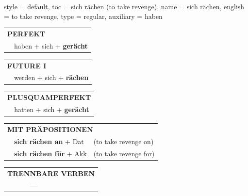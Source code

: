 \begin{verbentry}{
  style = {default},
  toc = {sich rächen (to take revenge)},
  name = {sich rächen},
  english = {to take revenge},
  type = {regular},
  auxiliary = {haben}
}
 \begin{tabular}{rl}
     \multicolumn{2}{l}{\textbf{PERFEKT}}\\
   & haben + sich + \textbf{gerächt}\\
  \end{tabular}
\hfill
   \begin{tabular}{rl}
    \multicolumn{2}{l}{\textbf{FUTURE I} }\\
   & werden + sich + \textbf{rächen}\\
  \end{tabular}
\hfill
   \begin{tabular}{rl}
      \multicolumn{2}{l}{\textbf{PLUSQUAMPERFEKT}}\\
   & hatten + sich + \textbf{gerächt}\\
  \end{tabular}

   \vspace{10pt}

   \begin{tabular}{lll}
      \multicolumn{3}{l}{\textbf{MIT PRÄPOSITIONEN}}\\
& \textbf{sich rächen an} + Dat & (to take revenge on)\\
& \textbf{sich rächen für} + Akk & (to take revenge for)\\
\end{tabular}
  \hfill
   \begin{tabular}{lll}
\multicolumn{3}{l}{\textbf{TRENNBARE VERBEN}}\\
& \textbf{---} & \\
\end{tabular}

  \vspace{-5pt}
\end{verbentry}

